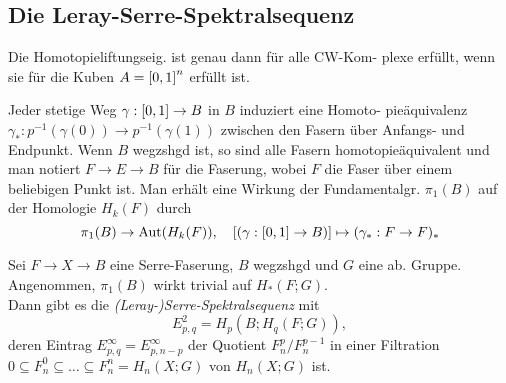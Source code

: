 \documentclass{cheat-sheet}
\newenvironment{centertikzcd}
  {\begin{center}\begin{tikzcd}}
  {\end{tikzcd}\end{center}}
\begin{document}
\subsection{Die Leray-Serre-Spektralsequenz}


\begin{lem}
  Die Homotopieliftungseig. ist genau dann für alle CW-Kom- plexe erfüllt, wenn sie für die Kuben $A = \left[ 0, 1 \right]^n$ erfüllt ist.
\end{lem}

\begin{bem}
  Jeder stetige Weg $\gamma : \left[ 0, 1 \right] \to B$ in $B$ induziert eine Homoto- pieäquivalenz $\gamma_* : p^{-1}(\gamma(0)) \to p^{-1}(\gamma(1))$ zwischen den Fasern über Anfangs- und Endpunkt.
  Wenn $B$ wegzshgd ist, so sind alle Fasern homotopieäquivalent und man notiert $F \to E \to B$ für die Faserung, wobei $F$ die Faser über einem beliebigen Punkt ist. Man erhält eine Wirkung der Fundamentalgr. $\pi_1(B)$ auf der Homologie $H_k(F)$ durch
  \[ \pi_1(B) \to \operatorname{Aut}(H_k(F)), \quad [(\gamma : \left[ 0, 1 \right] \to B)] \mapsto (\gamma_* : F \to F)_* \]
\end{bem}

\begin{thm}
  Sei $F \to X \to B$ eine Serre-Faserung, $B$ wegzshgd und $G$ eine ab. Gruppe. Angenommen, $\pi_1(B)$ wirkt trivial auf $H_*(F; G)$. \\
  Dann gibt es die \emph{(Leray-)Serre-Spektralsequenz} mit
  \[ E^2_{p,q} = H_p(B; H_q(F; G)), \]
  deren Eintrag $E^\infty_{p,q} = E^\infty_{p,n-p}$ der Quotient $F^p_n/F^{p-1}_n$ in einer Filtration
  $0 \subseteq F_n^0 \subseteq \ldots \subseteq F_n^n = H_n(X; G)$ von $H_n(X; G)$ ist.
\end{thm}
\end{document}
